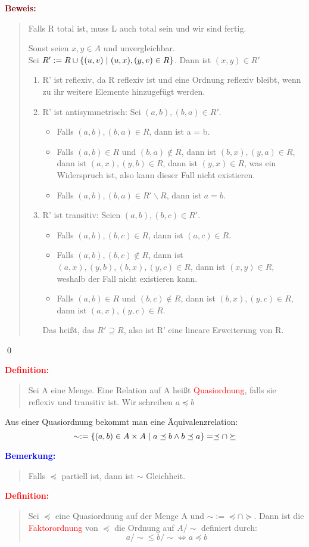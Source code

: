 \documentclass{article}
\newcommand{\smsp}{\phantom{\hspace{3px}}}
\newcommand{\red}[1]{\textcolor{red}{#1}}
\newcommand{\blue}[1]{\textcolor{blue}{#1}}
\newcommand{\maroon}[1]{\textcolor{maroon}{#1}}
\newcommand{\de}[1]{\red{\textbf{Definition: }}\begin{quote}#1\end{quote}}
\newcommand{\an}[1]{\blue{\textbf{Bemerkung: }}\begin{quote}#1\end{quote}}
\newcommand{\pr}[1]{\maroon{\textbf{Beweis: }}\begin{quote}#1\end{quote}\qed}
\renewcommand{\st}{\smsp | \smsp}
\newcommand{\bs}{\backslash}
\begin{document}
\newpage
\pr{
    Falls R total ist, muss L auch total sein und wir sind fertig.

    Sonst seien $x,y \in A$ und unvergleichbar.\\
    Sei $R' := R \cup \{(u,v) \st (u,x), (y,v) \in R\}$. Dann ist $(x,y) \in R'$
    \begin{enumerate}
        \item R' ist reflexiv, da R reflexiv ist und eine Ordnung reflexiv bleibt, wenn zu ihr weitere Elemente hinzugefügt werden.
        \item R' ist antisymmetrisch: Sei $(a,b), (b,a) \in R'$.
        \begin{itemize}
            \item Falls $(a,b), (b,a) \in R$, dann ist a = b.
            \item Falls $(a,b) \in R$ und $(b,a) \notin R$, dann ist $(b,x),(y,a) \in R$, dann ist $(a,x), (y,b) \in R$, dann ist $(y,x) \in R$, was ein Widerspruch ist, also kann dieser Fall nicht existieren.
            \item Falls $(a,b),(b,a) \in R' \bs R$, dann ist $a = b$.
        \end{itemize}
        \item R' ist transitiv: Seien $(a,b),(b,c) \in R'$.
        \begin{itemize}
            \item Falls $(a,b),(b,c) \in R$, dann ist $(a,c) \in R$.
            \item Falls $(a,b),(b,c) \notin R$, dann ist $(a,x),(y,b),(b,x),(y,c) \in R$, dann ist $(x,y) \in R$, weshalb der Fall nicht existieren kann.
            \item Falls $(a,b) \in R$ und $(b,c) \notin R$, dann ist $(b,x),(y,c) \in R$, dann ist $(a,x),(y,c) \in R$.
        \end{itemize}
        Das heißt, das $R' \supseteq R$, also ist R' eine lineare Erweiterung von R.
    \end{enumerate}
}

\de{
    Sei A eine Menge. Eine Relation auf A heißt \red{Quasiordnung}, falls sie reflexiv und transitiv ist. Wir schreiben $a \preceq b$
}

Aus einer Quasiordnung bekommt man eine Äquivalenzrelation:
\[
    \sim := \{(a,b) \in A \times A \st a \preceq b \land b \preceq a\} = \preceq \cap \succeq
\]

\an{
    Falls $\preceq$ partiell ist, dann ist $\sim$ Gleichheit.
}

\de{
    Sei $\preceq$ eine Quasiordnung auf der Menge A und $\sim := \preceq \cap \succeq$. Dann ist die \red{Faktorordnung} von $\preceq$ die Ordnung auf $A / \sim$ definiert durch:
    \[
        a/\sim \le b/\sim \iff a \preceq b
    \]
}
\end{document}
